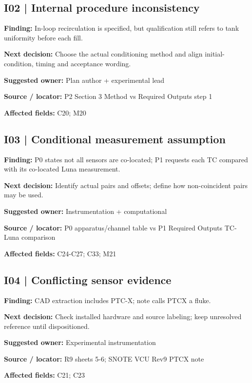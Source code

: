 \documentclass[11pt]{article}
\begin{document}
\begin{minipage}{\textwidth}\small\setlength{\parskip}{2pt}
\subsection*{I02 | Internal procedure inconsistency}
\textbf{Finding:} In-loop recirculation is specified, but qualification still refers to tank uniformity before each fill.\par
\textbf{Next decision:} Choose the actual conditioning method and align initial-condition, timing and acceptance wording.\par
\textbf{Suggested owner:} Plan author + experimental lead\par
\textbf{Source / locator:} P2 Section 3 Method vs Required Outputs step 1\par
\textbf{Affected fields:} C20; M20\par
\end{minipage}\par\vspace{8pt}
\begin{minipage}{\textwidth}\small\setlength{\parskip}{2pt}
\subsection*{I03 | Conditional measurement assumption}
\textbf{Finding:} P0 states not all sensors are co-located; P1 requests each TC compared with its co-located Luna measurement.\par
\textbf{Next decision:} Identify actual pairs and offsets; define how non-coincident pairs may be used.\par
\textbf{Suggested owner:} Instrumentation + computational\par
\textbf{Source / locator:} P0 apparatus/channel table vs P1 Required Outputs TC-Luna comparison\par
\textbf{Affected fields:} C24-C27; C33; M21\par
\end{minipage}\par\vspace{8pt}
\begin{minipage}{\textwidth}\small\setlength{\parskip}{2pt}
\subsection*{I04 | Conflicting sensor evidence}
\textbf{Finding:} CAD extraction includes PTC-X; note calls PTCX a fluke.\par
\textbf{Next decision:} Check installed hardware and source labeling; keep unresolved reference until dispositioned.\par
\textbf{Suggested owner:} Experimental instrumentation\par
\textbf{Source / locator:} R9 sheets 5-6; SNOTE VCU Rev9 PTCX note\par
\textbf{Affected fields:} C21; C23\par
\end{minipage}\par\vspace{8pt}
\end{document}
